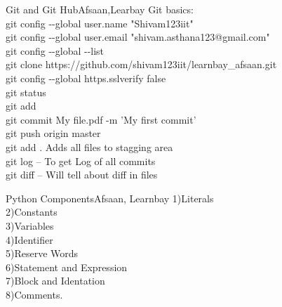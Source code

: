 \documentclass[aspectratio=169, 10pt]{beamer}
\begin{document}
\begin{frame}[t]{Git and Git Hub}{Afsaan,Learbay}
Git basics:\\  \vspace{0.25 cm}
git config -\hspace{1mm}-global user.name "Shivam123iit"\\
git config -\hspace{1mm}-global user.email "shivam.asthana123@gmail.com"\\
git config -\hspace{1mm}-global -\hspace{1mm}-list\\
git clone    https://github.com/shivam123iit/learnbay\_afsaan.git\\
git config -\hspace{1mm}-global https.sslverify false\\
git status \\
git add \\
git commit My file.pdf -m 'My first commit' \\ 
git push origin master \\
git add . Adds all files to stagging area\\
git log -- To get Log of all commits \\
git diff -- Will tell about diff in files\\
 
\end{frame}
\begin{frame}[t]{Python Components}{Afsaan, Learnbay}
1)\hspace{1 cm}Literals\\
2)\hspace{1 cm}Constants\\
3)\hspace{1 cm}Variables\\
4)\hspace{1 cm}Identifier\\
5)\hspace{1 cm}Reserve Words\\
6)\hspace{1 cm}Statement and Expression\\
7)\hspace{1 cm}Block and Identation\\
8)\hspace{1 cm}Comments. \\
\end{frame}
\end{document}
